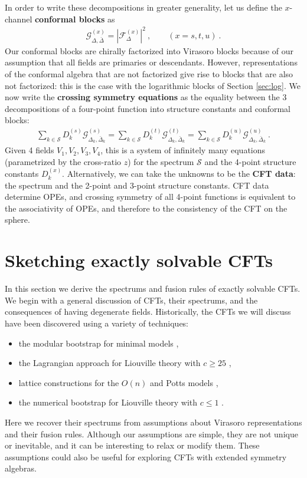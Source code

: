 \documentclass[12pt, a4paper]{article}
\theoremstyle{break}
\begin{document}
In order to write these decompositions in greater generality, let us define the $x$-channel \textbf{conformal blocks} as 
\begin{align}
 \mathcal{G}^{(x)}_{\Delta,\bar\Delta} = \left|\mathcal{F}_{\Delta}^{(x)}\right|^2\ , \qquad (x=s,t,u)\ . 
 \label{gf2}
\end{align}
Our conformal blocks are chirally factorized into Virasoro blocks because of our assumption that all fields are primaries or descendants. However, representations of the conformal algebra that are not factorized give rise to blocks that are also not factorized: this is the case with the logarithmic blocks of Section \ref{sec:log}. We now write the \textbf{crossing symmetry equations} as the equality between the 3 decompositions of a four-point function into structure constants and conformal blocks:
\begin{align}
 \boxed{\sum_{k\in\mathcal{S}} D_k^{(s)} \mathcal{G}^{(s)}_{\Delta_k,\bar\Delta_k} = \sum_{k\in\mathcal{S}} D_k^{(t)} \mathcal{G}^{(t)}_{\Delta_k,\bar\Delta_k} = \sum_{k\in\mathcal{S}} D_k^{(u)} \mathcal{G}^{(u)}_{\Delta_k,\bar\Delta_k}} \ . 
 \label{seteu}
\end{align}
Given 4 fields $V_1,V_2,V_3,V_4$, this is a system of infinitely many equations (parametrized by the cross-ratio $z$) for the spectrum $\mathcal{S}$ and the 4-point structure constants $D_k^{(x)}$. Alternatively, we can take the unknowns to be the \textbf{CFT data}: the spectrum and the 2-point and 3-point structure constants. CFT data determine OPEs, and crossing symmetry of all 4-point functions is equivalent to the associativity of OPEs, and therefore to the consistency of the CFT on the sphere. 


\section{Sketching exactly solvable CFTs}\label{sec:sesc}

In this section we derive the spectrums and fusion rules of exactly solvable CFTs. We begin with a general discussion of CFTs, their spectrums, and the consequences of having degenerate fields. Historically, the CFTs we will discuss have been discovered using a variety of techniques: 
\begin{itemize}
 \item the modular bootstrap for minimal models \cite{fms97},
 \item the Lagrangian approach for Liouville theory with $c\geq 25$ \cite{zz95},
 \item lattice constructions for the $O(n)$ and Potts models \cite{fsz87},
 \item the numerical bootstrap for Liouville theory with $c\leq 1$ \cite{rs15}.
\end{itemize}
Here we recover their spectrums from assumptions about Virasoro representations and their fusion rules. Although our assumptions are simple, they are not unique or inevitable, and it can be interesting to relax or modify them. These assumptions could also be useful for exploring CFTs with extended symmetry algebras. 
\end{document}
